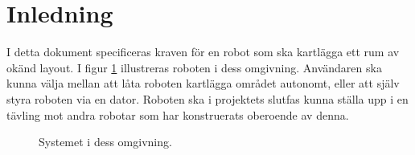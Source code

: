 \documentclass[a4paper,11pt]{article}
\begin{document}
\pagestyle{intro}
\LIPStitelsida
\clearpage
\begin{LIPSprojektidentitet}
\end{LIPSprojektidentitet}
\clearpage
\renewcommand{\familydefault}{\sfdefault}	%
\normalfont
\tableofcontents
\renewcommand{\familydefault}{\rmdefault}	%
\normalfont
\clearpage
\begin{LIPSdokumenthistorik}
\end{LIPSdokumenthistorik}
\clearpage
\setcounter{page}{1}
\pagestyle{content}

\section{Inledning}
I detta dokument specificeras kraven för en robot som ska kartlägga ett rum av okänd layout. I figur \ref{fig:overview} illustreras roboten i dess omgivning. Användaren ska kunna välja mellan att låta roboten kartlägga området autonomt, eller att själv styra roboten via en dator. Roboten ska i projektets slutfas kunna ställa upp i en tävling mot andra robotar som har konstruerats oberoende av denna.

\begin{figure}[h!]
    \caption{Systemet i dess omgivning.}
    \label{fig:overview}
\end{figure}
\end{document}
